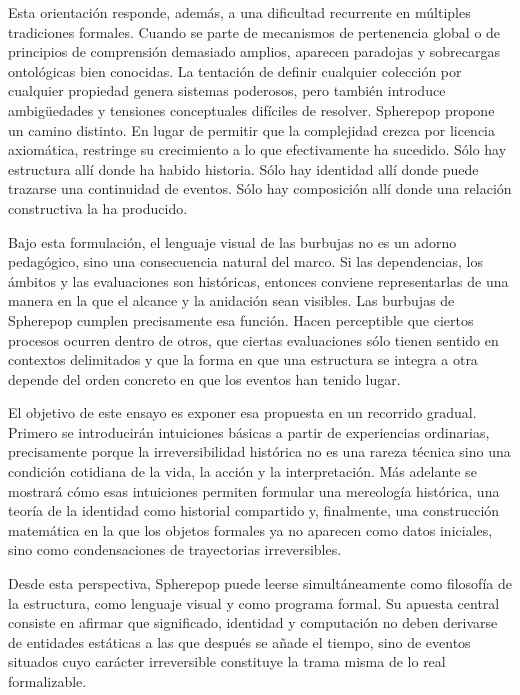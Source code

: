 \documentclass[12pt]{article}
\begin{document}
Esta orientación responde, además, a una dificultad recurrente en múltiples tradiciones formales. Cuando se parte de mecanismos de pertenencia global o de principios de comprensión demasiado amplios, aparecen paradojas y sobrecargas ontológicas bien conocidas. La tentación de definir cualquier colección por cualquier propiedad genera sistemas poderosos, pero también introduce ambigüedades y tensiones conceptuales difíciles de resolver. Spherepop propone un camino distinto. En lugar de permitir que la complejidad crezca por licencia axiomática, restringe su crecimiento a lo que efectivamente ha sucedido. Sólo hay estructura allí donde ha habido historia. Sólo hay identidad allí donde puede trazarse una continuidad de eventos. Sólo hay composición allí donde una relación constructiva la ha producido.

Bajo esta formulación, el lenguaje visual de las burbujas no es un adorno pedagógico, sino una consecuencia natural del marco. Si las dependencias, los ámbitos y las evaluaciones son históricas, entonces conviene representarlas de una manera en la que el alcance y la anidación sean visibles. Las burbujas de Spherepop cumplen precisamente esa función. Hacen perceptible que ciertos procesos ocurren dentro de otros, que ciertas evaluaciones sólo tienen sentido en contextos delimitados y que la forma en que una estructura se integra a otra depende del orden concreto en que los eventos han tenido lugar.

El objetivo de este ensayo es exponer esa propuesta en un recorrido gradual. Primero se introducirán intuiciones básicas a partir de experiencias ordinarias, precisamente porque la irreversibilidad histórica no es una rareza técnica sino una condición cotidiana de la vida, la acción y la interpretación. Más adelante se mostrará cómo esas intuiciones permiten formular una mereología histórica, una teoría de la identidad como historial compartido y, finalmente, una construcción matemática en la que los objetos formales ya no aparecen como datos iniciales, sino como condensaciones de trayectorias irreversibles.

Desde esta perspectiva, Spherepop puede leerse simultáneamente como filosofía de la estructura, como lenguaje visual y como programa formal. Su apuesta central consiste en afirmar que significado, identidad y computación no deben derivarse de entidades estáticas a las que después se añade el tiempo, sino de eventos situados cuyo carácter irreversible constituye la trama misma de lo real formalizable.
\end{document}
